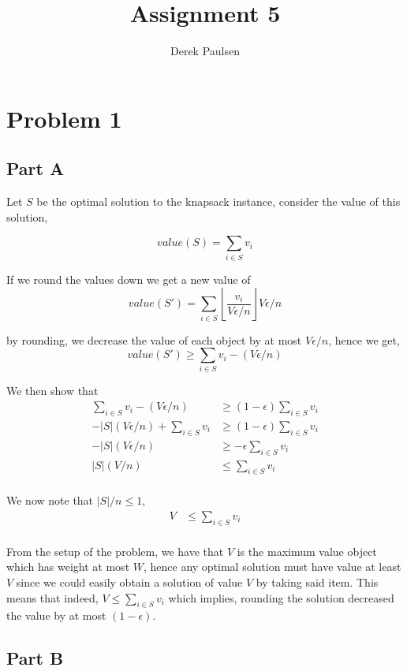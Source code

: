 \documentclass[a4paper]{article}
\title{Assignment 5} %
\author{
Derek Paulsen \\
}
\date{}
\begin{document}
\maketitle 

\section{Problem 1}
\subsection{Part A}

Let $S$ be the optimal solution to the knapsack instance, consider the value of this solution,

$$
value(S) = \sum_{i\in S} v_i
$$

If we round the values down we get a new value of 
$$
value(S') = \sum_{i\in S} \left\lfloor \frac{v_i}{V\epsilon/n} \right\rfloor V\epsilon/n
$$

by rounding, we decrease the value of each object by at most $V\epsilon/n$, hence we get,
$$
value(S') \geq  \sum_{i\in S}  v_i -(V\epsilon/n)
$$

We then show that 
\begin{align*}
	\sum_{i\in S}  v_i -(V\epsilon/n) &\geq  (1-\epsilon)\sum_{i \in S} v_i\\
	-|S|(V\epsilon/n) + \sum_{i\in S}  v_i  &\geq  (1-\epsilon)\sum_{i \in S} v_i\\
	-|S|(V\epsilon/n) &\geq  -\epsilon\sum_{i \in S} v_i\\
	|S|(V/n) &\leq  \sum_{i \in S} v_i\\
\end{align*}

We now note that $|S|/n \leq 1$, 
\begin{align*}
	V &\leq  \sum_{i \in S} v_i\\
\end{align*}

From the setup of the problem, we have that $V$ is the maximum value object which has weight at most $W$,
hence any optimal solution must have value at least $V$ since we could easily obtain a solution 
of value $V$ by taking said item. This means that indeed, $V \leq  \sum_{i \in S} v_i$ which implies, 
rounding the solution decreased the value by at most $(1-\epsilon)$. 

\subsection{Part B}
\end{document}
